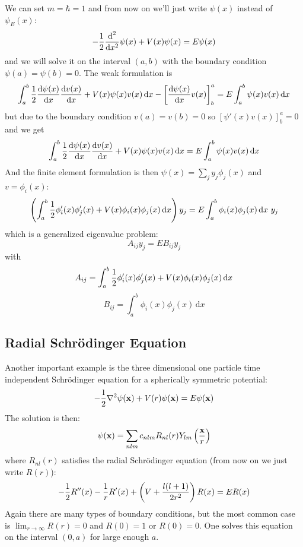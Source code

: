 \documentclass[12pt]{article}
\def\d{\mbox{d}}
\begin{document}
We can set $m=\hbar=1$ and from now on we'll just write $\psi(x)$ instead of
$\psi_E(x)$:
$$
-{1\over2}{\d^2\over\d x^2}\psi(x)+V(x)\psi(x)=E\psi(x)
$$
and we will solve it on the interval $(a, b)$ with the boundary condition
$\psi(a)=\psi(b)=0$. The weak formulation is
$$
\int_a^b{1\over2}{\d\psi(x)\over\d x}{\d v(x)\over\d x}+V(x)\psi(x)v(x)\,\d x
-\left[{\d\psi(x)\over\d x}v(x)\right]^a_b
=E\int_a^b\psi(x)v(x)\,\d x
$$
but due to the boundary condition $v(a)=v(b)=0$ so
$\left[\psi'(x)v(x)\right]^a_b=0$ and we get
$$
\int_a^b{1\over2}{\d\psi(x)\over\d x}{\d v(x)\over\d x}+V(x)\psi(x)v(x)\,\d x
=E\int_a^b\psi(x)v(x)\,\d x
$$
And the finite element formulation is then $\psi(x)=\sum_j y_j\phi_j(x)$ and
$v=\phi_i(x)$:
$$
\left(\int_a^b{1\over2}\phi_i'(x)\phi_j'(x)+V(x)\phi_i(x)\phi_j(x)\,\d x\right)
y_j
=E\int_a^b\phi_i(x)\phi_j(x)\,\d x\ y_j
$$
which is a generalized eigenvalue problem:
$$
A_{ij}y_j=EB_{ij}y_j
$$
with
$$
A_{ij}=\int_a^b{1\over2}\phi_i'(x)\phi_j'(x)+V(x)\phi_i(x)\phi_j(x)\,\d x
$$
$$
B_{ij}=\int_a^b\phi_i(x)\phi_j(x)\,\d x
$$


\subsection{Radial Schr\"odinger Equation}

Another important example is the three dimensional one particle time
independent Schr\"odinger equation for a spherically symmetric potential:
$$
-{1\over2}\nabla^2\psi({\bf x})+V(r)\psi({\bf x})=E\psi({\bf x})
$$
The solution is then:
$$\psi({\bf x})=\sum_{nlm}c_{nlm}R_{nl}(r)Y_{lm}\left({\bf x}\over r\right)$$
where $R_{nl}(r)$ satisfies the radial Schr\"odinger equation (from now on we
just write $R(r)$):
$$-{1\over2}R''(x)-{1\over r}R'(x)+\left(V+{l(l+1)\over2r^2}\right)R(x)=ER(x)$$
Again there are many types of boundary conditions, but the most common case is
$\lim_{r\to\infty}R(r)=0$ and $R(0)=1$ or $R(0)=0$. One solves this equation on
the interval $(0, a)$ for large enough $a$.
\end{document}
